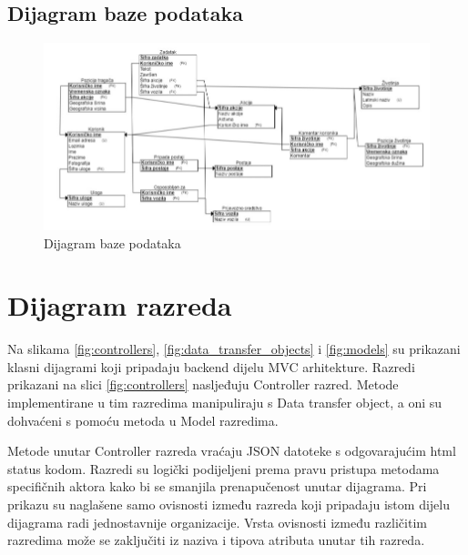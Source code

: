 			\eject

			\subsection{Dijagram baze podataka}

			\begin{figure}[H]
				\includegraphics[scale=0.9]{slike/dijagram baze podataka.png} 
				\centering
				\caption{Dijagram baze podataka}
				\label{fig:dijagram_baze_podataka}
			\end{figure}
			
			\eject
			
			
		\section{Dijagram razreda}

		Na slikama \ref{fig:controllers}, \ref{fig:data_transfer_objects} i \ref{fig:models} su prikazani klasni dijagrami koji pripadaju backend dijelu MVC
		arhitekture. Razredi prikazani na slici \ref{fig:controllers} nasljeđuju Controller razred. 
		Metode implementirane u tim razredima manipuliraju s Data transfer object, a oni
		su dohvaćeni s pomoću metoda u Model razredima. 

		Metode unutar Controller razreda vraćaju JSON datoteke s odgovarajućim html status kodom.
		Razredi su logički podijeljeni prema pravu pristupa metodama specifičnih aktora kako bi se smanjila prenapučenost unutar dijagrama.
		Pri prikazu su naglašene samo ovisnosti između razreda koji pripadaju istom dijelu dijagrama radi jednostavnije organizacije.
		Vrsta ovisnosti između različitim razredima može se zaključiti iz naziva i tipova atributa unutar tih razreda.
		
		\eject

